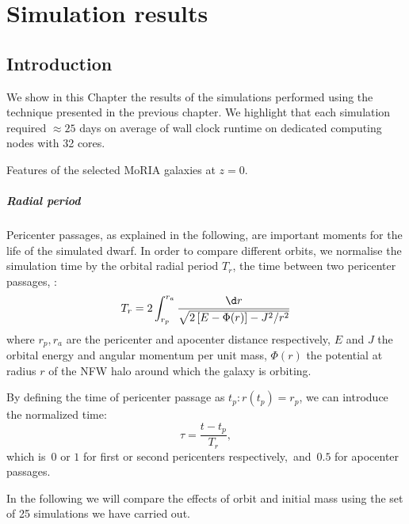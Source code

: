 
\chapter{Simulation results}
\label{ch:sim_results}

\section{Introduction}
We show in this Chapter the results of the simulations performed using the technique presented in the previous chapter.
We highlight that each simulation required $\approx 25$ days on average of wall clock runtime on dedicated computing nodes with 32 cores.

\begin{sidewaystable}
 \centering
 \footnotesize
 
 \caption{Features of the selected MoRIA galaxies at $z=0$.} \label{tbl:galaxies}
\end{sidewaystable}


\paragraph*{Radial period}
Pericenter passages, as explained in the following, are important moments for the life of the simulated dwarf.
In order to compare different orbits, we normalise the simulation time by the orbital radial period $T_r$, \ie{} the time between two pericenter passages, \citep[p.~146]{BinneyTremaine2008}:
\begin{equation}
    T_r = 2 \int^{r_a}_{r_p} \frac{\d r}{\sqrt{2\left[E-\Phi(r) \right] - J^2/r^2}}
    \label{eq:radial_period}
\end{equation}
where $r_p, r_a$ are the pericenter and apocenter distance respectively, $E$ and $J$ the orbital energy and angular momentum per unit mass, $\Phi(r)$ the potential at radius $r$ of the NFW halo around which the galaxy is orbiting.

By defining the time of pericenter passage as $t_p: r(t_p) = r_p$, we can introduce the normalized time:
\begin{equation}
\tau = \frac{t-t_p}{T_r},
\end{equation}
which is~$0$ or $1$ for first or second pericenters respectively,~and~$0.5$ for apocenter passages.

In the following we will compare the effects of orbit and initial mass using the set of 25 simulations we have carried out.


